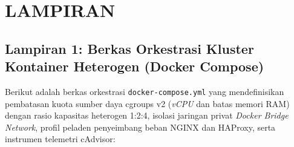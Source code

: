 
\clearpage
{}
\chapter*{LAMPIRAN}

\vspace{0.5cm}

\section*{Lampiran 1: Berkas Orkestrasi Kluster Kontainer Heterogen (Docker Compose)}

Berikut adalah berkas orkestrasi \texttt{docker-compose.yml} yang mendefinisikan pembatasan kuota sumber daya cgroups v2 (\textit{vCPU} dan batas memori RAM) dengan rasio kapasitas heterogen 1:2:4, isolasi jaringan privat \textit{Docker Bridge Network}, profil peladen penyeimbang beban NGINX dan HAProxy, serta instrumen telemetri cAdvisor:

